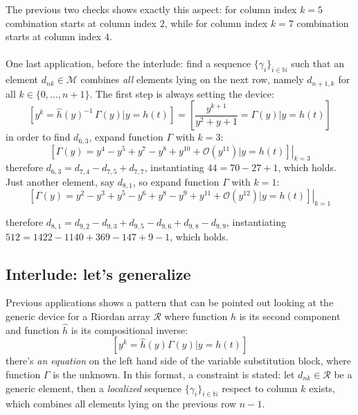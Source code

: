 The previous two checks shows exactly this aspect: for column index $k=5$
combination starts at column index $2$, while for column index $k=7$ combination
starts at column index $4$.
\\\\
One last application, before the interlude: 
find a sequence $\lbrace \gamma_{i} \rbrace_{i\in\mathbb{N}}$ such that 
an element $d_{nk}\in\mathcal{M}$ combines \emph{all} elements lying on 
the next row, namely $d_{n+1,k}$ for all $k\in\lbrace0,\ldots,n+1\rbrace$.
The first step is always setting the device:
\begin{displaymath}
    \left[y^{k} = \hat{h}(y)^{-1}\,\Gamma(y) \big| y = h(t) \right]=
        \left[ \frac{y^{k + 1}}{y^2 + y + 1} = \Gamma(y) \big| y = h(t) \right]
\end{displaymath}
in order to find $d_{6,3}$,  expand function $\Gamma$ with $k=3$:
\begin{displaymath}
    \left.\left[\Gamma(y)=y^4 -y^5 + y^7 -y^8 +y^{10} + \mathcal{O}(y^{11}) 
        \big| y = h(t) \right]\right|_{k=3}
\end{displaymath}
therefore $d_{6,3}=d_{7,4} - d_{7,5} + d_{7,7}$, instantiating $44 = 70 -27 +1$, 
which holds. Just another element, say $d_{8,1}$, so expand function 
$\Gamma$ with $k=1$:
\begin{displaymath}
    \left.\left[\Gamma(y)=y^2 -y^3 + y^5 -y^6 + y^8 -y^9 + y^{11} + 
        \mathcal{O}(y^{12}) \big| y = h(t) \right]\right|_{k=1}
\end{displaymath}

therefore $d_{8,1}=d_{9,2} - d_{9,3} + d_{9,5}- d_{9,6}+ d_{9,8}- d_{9,9}$, 
instantiating $512 = 1422 -1140 +369 -147 +9 -1$, which holds.
\iffalse
\\\\
As a final remark, under the insights of two solved exercises, is that a
sequence found using this approach, knows which elements to combine and which
ones to discard, we're required to supply the set of available elements only.
\fi

\subsection{Interlude: let's generalize}
\label{subsec:sequences:interluce:generalization}

Previous applications shows a pattern that can be pointed out looking at 
the generic device for a Riordan array $\mathcal{R}$ where 
function $h$ is its second component and function $\hat{h}$ 
is its compositional inverse:
\begin{displaymath}
    \left[y^{k} = \hat{h}(y) \Gamma(y) \big| y = h(t) \right]
\end{displaymath}
there's \emph{an equation} on the left hand side of the variable substitution block, 
where function $\Gamma$ is the unknown. In this format, 
a constraint is stated: let $d_{nk}\in\mathcal{R}$ be a generic element, 
then a \emph{localized} sequence 
$\lbrace \gamma_{i} \rbrace_{i\in\mathbb{N}}$ respect to column $k$ exists, which
combines all elements lying on the previous row $n-1$.

